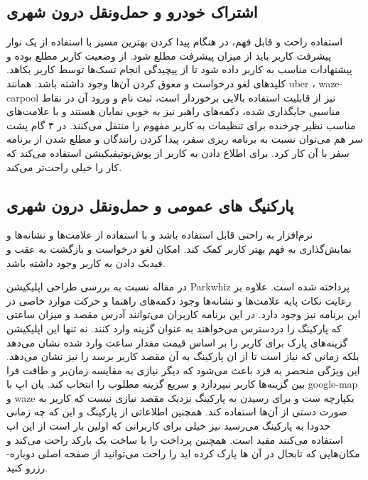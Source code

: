 \subsection{اشتراک خودرو و حمل‌و‌نقل درون شهری}
استفاده راحت و قابل فهم، در هنگام پیدا کردن بهترین مسیر با استفاده از یک نوار پیشرفت کاربر باید از میزان پیشرفت مطلع شود. از وضعیت کاربر مطلع بوده و پیشنهادات مناسب به کاربر داده شود تا از پیچیدگی انجام تسک‌ها توسط کاربر بکاهد. کلیدهای لغو درخواست و معوق کردن آن‌ها وجود داشته باشد.
همانند uber ، waze-carpool نیز از قابلیت استفاده بالایی برخوردار است، ثبت نام و ورود آن در نقاط مناسبی جایگذاری شده، دکمه‌های راهبر نیز به خوبی نمایان هستند و با علامت‌های مناسب نظیر چرخنده برای تنظیمات به کاربر مفهوم را منتقل می‌کنند. در ۳ گام پشت سر هم می‌توان نسبت به برنامه ریزی سفر، پیدا کردن رانندگان و مطلع شدن از برنامه سفر با آن کار کرد.
برای اطلاع دادن به کاربر از پوش‌نوتیفیکیشن استفاده می‌کند که کار را خیلی راحت‌تر می‌کند.

\subsection{پارکنیگ های عمومی و حمل‌و‌نقل درون شهری}
نرم‌افزار به راحتی قابل استفاده باشد و با استفاده از علامت‌ها و نشانه‌ها و نمایش‌گذاری به فهم بهتر کاربر کمک کند. امکان لغو درخواست و بازگشت به عقب و فیدبک دادن به کاربر وجود داشته باشد.

در مقاله \cite{parkwhiz_ux} نسبت به بررسی طراحی اپلیکیشن Parkwhiz پرداخته شده است.
علاوه بر رعایت نکات پایه علامت‌ها و نشانه‌ها وجود دکمه‌های راهنما و حرکت موارد خاصی در این برنامه نیز وجود دارد.
 در این برنامه کاربران می‌توانند آدرس مقصد و میزان ساعتی که پارکینگ را دردسترس می‌خواهند به عنوان گزینه وارد کنند. نه تنها این اپلیکیشن گزینه‌های پارک برای کاربر را بر اساس قیمت‌ مقدار ساعت وارد شده نشان می‌دهد بلکه زمانی که نیاز است تا از ان پارکینگ به آن مقصد کاربر برسد را نیز نشان می‌دهد.
این ویژگی منحصر به فرد باعث می‌شود که دیگر نیازی به مقایسه زمان‌بر و طاقت فرا بین گزینه‌ها کاربر نبپردازد و سریع گزینه مطلوب را انتخاب کند.
یان اپ با google-map و waze یکپارچه ست و برای رسیدن به پارکینگ نزدیک مقصد نیازی نیست که کاربر به صورت دستی از آن‌ها استفاده کند. 
همچنین اطلاعاتی از پارکینگ و این که چه زمانی حدودا به پارکینگ می‌رسید نیز خیلی برای کاربرانی که اولین بار است از این اپ استفاده می‌کنند مفید است.
همچنین پرداخت را با ساخت یک بارکد راحت می‌کند و مکان‌هایی که تابحال در آن ها پارک کرده اید را راحت می‌توانید از صفحه اصلی دوباره-رزرو کنید. 
